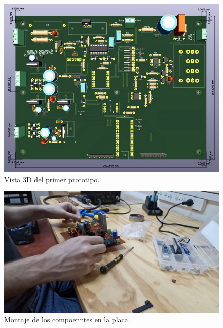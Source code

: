 \begin{figure}[H]
    \centering
    \includegraphics[scale=0.5]{./imagenes/prototipo1.jpg}
    \caption{Vista 3D del primer prototipo.}
    \label{F:PCB_3D}
\end{figure}
\begin{figure}[H]
    \centering
    \includegraphics[scale=0.1]{./imagenes/fotos/montaje.jpg}
    \caption{Montaje de los compoenntes en la placa.}
    \label{F:montaje_componentes}
\end{figure}

